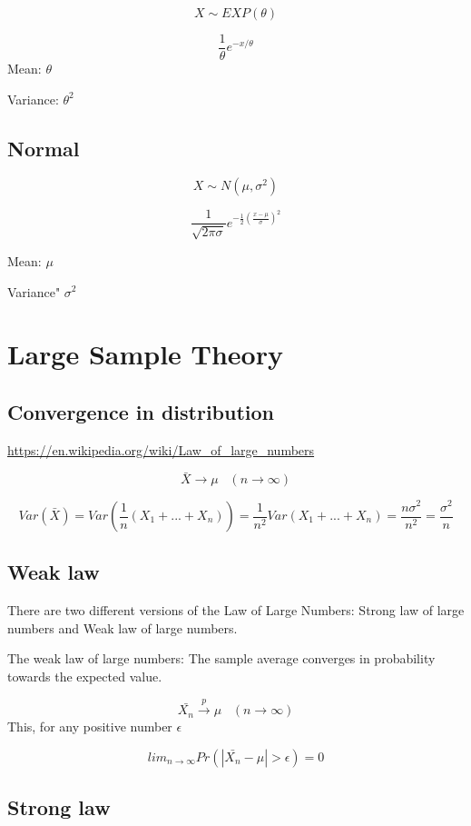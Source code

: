 \documentclass[
]{book}
\begin{document}
\[X \sim EXP(\theta)\]

\[\frac{1}{\theta} e^{-x/\theta}\]
Mean: \(\theta\)

Variance: \(\theta^2\)

\hypertarget{normal}{%
\subsection{Normal}\label{normal}}

\[X\sim N(\mu, \sigma^2)\]

\[\frac{1}{\sqrt{2 \pi \sigma}} e^{-\frac{1}{2}(\frac{x-\mu}{\sigma})^2}\]

Mean: \(\mu\)

Variance" \(\sigma^2\)

\hypertarget{large-sample-theory}{%
\section{Large Sample Theory}\label{large-sample-theory}}

\hypertarget{convergence-in-distribution}{%
\subsection{Convergence in distribution}\label{convergence-in-distribution}}

\url{https://en.wikipedia.org/wiki/Law_of_large_numbers}

\[\bar{X} \rightarrow \mu \; \; \; (n \rightarrow \infty)\]

\[Var(\bar{X})=Var(\frac{1}{n}(X_1+...+X_n))=\frac{1}{n^2}Var(X_1+...+X_n)=\frac{n \sigma^2}{n^2}=\frac{\sigma^2}{n}\]

\hypertarget{weak-law}{%
\subsection{Weak law}\label{weak-law}}

There are two different versions of the Law of Large Numbers: Strong law of large numbers and Weak law of large numbers.

The weak law of large numbers: The sample average converges in probability towards the expected value.

\[\bar{X_n} \xrightarrow{p} \mu \; \; \; (n \rightarrow \infty)\]
This, for any positive number \(\epsilon\)

\[lim_{n \rightarrow \infty} Pr(|\bar{X_n}-\mu|>\epsilon)=0\]

\hypertarget{strong-law}{%
\subsection{Strong law}\label{strong-law}}
\end{document}
